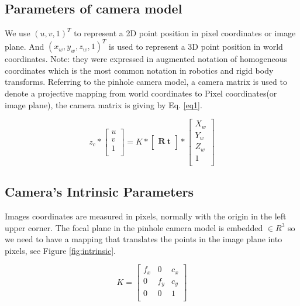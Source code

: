 \subsection{Parameters of camera model}
We use $(u,v,1)^{T}$ to represent a 2D point position in pixel coordinates or image plane. And $(x_{w},y_{w},z_{w},1)^{T}$ is used to represent a 3D point position in world coordinates. Note: they were expressed in augmented notation of homogeneous coordinates which is the most common notation in robotics and rigid body transforms. Referring to the pinhole camera model, a camera matrix is used to denote a projective mapping from world coordinates  to Pixel coordinates(or image plane), the camera matrix is giving by Eq. \ref{eq1}.

\begin{equation}\label{eq1}
z_{c}*
\left[ {\begin{array}{c}
u \\
v \\
1 \\
\end{array} } \right]
= K*
\left[ {\begin{array}{c}
\textbf{R} \ \textbf{t} \\
\end{array} } \right]
*\left[ {\begin{array}{c}
X_{w}\\
Y_{w} \\
Z_{w} \\
1\\
\end{array} } \right]\end{equation}

\subsection{Camera's Intrinsic Parameters}
Images coordinates are measured in pixels, normally with the origin in the left upper corner. The focal
plane in the pinhole camera model is embedded $\in R^{3}$ so we need to have a mapping that translates
the points in the image plane into pixels, see Figure \ref{fig:intrinsic}.

\begin{equation}\label{eq2}
   K=
    \left[ {\begin{array}{cccc}
   f_{x} & 0 & c_{x} \\
   0 & f_{y} & c_{y} \\
   0 & 0 & 1\\

  \end{array} } \right]    
\end{equation}



